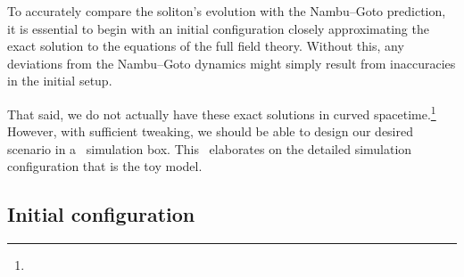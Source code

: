 



\newcommand{\epsA}{\ALIASepsA}
\newcommand{\epsB}{\ALIASepsB}
\newcommand{\epsC}{\ALIASepsC}
\newcommand{\hpAB}{\ALIAShpAB}
\newcommand{\hpA}{\ALIAShpA}
\newcommand{\hpB}{\ALIAShpB}
\newcommand{\hpC}{\ALIAShpC}





To accurately compare the soliton's evolution with the Nambu--Goto prediction, it is essential to begin with an initial configuration closely approximating the exact solution to the equations of the full field theory. Without this, any deviations from the Nambu--Goto dynamics might simply result from inaccuracies in the initial setup.

That said, we do not actually have these exact solutions in curved spacetime.\footnote{} However, with sufficient tweaking, we should be able to design our desired scenario in a~\gevolution{} simulation box.
This~ elaborates on the detailed simulation configuration that is the toy model.





\subsection{Initial configuration}

